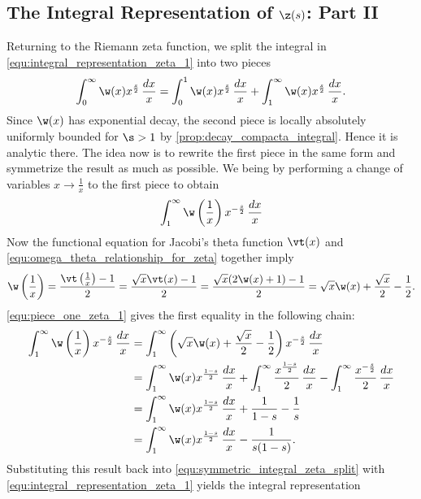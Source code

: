     \subsection*{The Integral Representation of \texorpdfstring{$\z(s)$}{\z(s)}: Part II}
      Returning to the Riemann zeta function, we split the integral in \cref{equ:integral_representation_zeta_1} into two pieces
      \begin{equation}\label{equ:symmetric_integral_zeta_split}
        \int_{0}^{\infty}\w(x)x^{\frac{s}{2}}\,\frac{dx}{x} = \int_{0}^{1}\w(x)x^{\frac{s}{2}}\,\frac{dx}{x}+\int_{1}^{\infty}\w(x)x^{\frac{s}{2}}\,\frac{dx}{x}.
      \end{equation}
      Since $\w(x)$ has exponential decay, the second piece is locally absolutely uniformly bounded for $\s > 1$ by \cref{prop:decay_compacta_integral}. Hence it is analytic there. The idea now is to rewrite the first piece in the same form and symmetrize the result as much as possible. We being by performing a change of variables $x \to \frac{1}{x}$ to the first piece to obtain
      \[
        \int_{1}^{\infty}\w\left(\frac{1}{x}\right)x^{-\frac{s}{2}}\,\frac{dx}{x}
      \]
      Now the functional equation for Jacobi's theta function $\vt(x)$ and \cref{equ:omega_theta_relationship_for_zeta} together imply
      \begin{equation}\label{equ:piece_one_zeta_1}
        \w\left(\frac{1}{x}\right) = \frac{\vt\left(\frac{1}{x}\right)-1}{2} = \frac{\sqrt{x}\vt(x)-1}{2} = \frac{\sqrt{x}(2\w(x)+1)-1}{2} = \sqrt{x}\w(x)+\frac{\sqrt{x}}{2}-\frac{1}{2}.
      \end{equation}
      \cref{equ:piece_one_zeta_1} gives the first equality in the following chain:
      \begin{align*}
        \int_{1}^{\infty}\w\left(\frac{1}{x}\right)x^{-\frac{s}{2}}\,\frac{dx}{x} &= \int_{1}^{\infty}\left(\sqrt{x}\w(x)+\frac{\sqrt{x}}{2}-\frac{1}{2}\right)x^{-\frac{s}{2}}\,\frac{dx}{x} \\
        &= \int_{1}^{\infty}\w(x)x^{\frac{1-s}{2}}\,\frac{dx}{x}+\int_{1}^{\infty}\frac{x^{\frac{1-s}{2}}}{2}\,\frac{dx}{x}-\int_{1}^{\infty}\frac{x^{-\frac{s}{2}}}{2}\,\frac{dx}{x} \\
        &= \int_{1}^{\infty}\w(x)x^{\frac{1-s}{2}}\,\frac{dx}{x}+\frac{1}{1-s}-\frac{1}{s} \\
        &= \int_{1}^{\infty}\w(x)x^{\frac{1-s}{2}}\,\frac{dx}{x}-\frac{1}{s(1-s)}.
      \end{align*}
      Substituting this result back into \cref{equ:symmetric_integral_zeta_split} with \cref{equ:integral_representation_zeta_1} yields the integral representation

